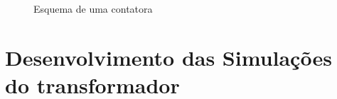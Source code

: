 \documentclass[a4paper]{article}
\theoremstyle{definition}
\theoremstyle{plain}
\begin{document}
\begin{figure}
\centering
{}
\caption{Esquema de uma contatora}
\end{figure}

 


\section{Desenvolvimento das Simulações do transformador}
\end{document}
